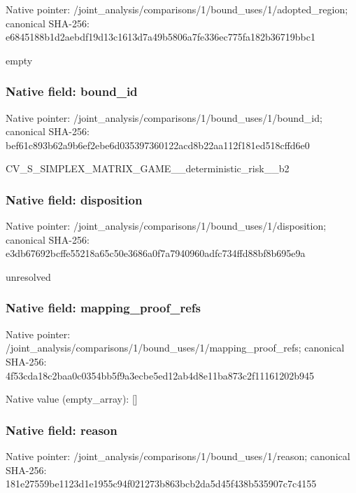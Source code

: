 \documentclass[10pt,a4paper]{article}
\begin{document}
Native pointer: /joint\_analysis/comparis\allowbreak{}ons/1/bound\_uses/1/adopt\allowbreak{}ed\_region; canonical SHA-256: e6845188b1d2aebdf19d13c1\allowbreak{}613d7a49b5806a7fe336ec77\allowbreak{}5fa182b36719bbc1


empty


\subsubsection{Native field: bound\_id}


Native pointer: /joint\_analysis/comparis\allowbreak{}ons/1/bound\_uses/1/bound\allowbreak{}\_id; canonical SHA-256: bef61c893b62a9b6ef2ebe6d\allowbreak{}035397360122acd8b22aa112\allowbreak{}f181ed518cffd6e0


CV\_S\_SIMPLEX\_MATRIX\_GAME\allowbreak{}\_\_deterministic\_risk\_\_b2


\subsubsection{Native field: disposition}


Native pointer: /joint\_analysis/comparis\allowbreak{}ons/1/bound\_uses/1/dispo\allowbreak{}sition; canonical SHA-256: e3db67692bcffe55218a65c5\allowbreak{}0e3686a0f7a7940960adfc73\allowbreak{}4ffd88bf8b695e9a


unresolved


\subsubsection{Native field: mapping\_proof\_refs}


Native pointer: /joint\_analysis/comparis\allowbreak{}ons/1/bound\_uses/1/mappi\allowbreak{}ng\_proof\_refs; canonical SHA-256: 4f53cda18c2baa0c0354bb5f\allowbreak{}9a3ecbe5ed12ab4d8e11ba87\allowbreak{}3c2f11161202b945



Native value (empty\_array): []



\subsubsection{Native field: reason}


Native pointer: /joint\_analysis/comparis\allowbreak{}ons/1/bound\_uses/1/reaso\allowbreak{}n; canonical SHA-256: 181e27559be1123d1e1955c9\allowbreak{}4f021273b863bcb2da5d45f4\allowbreak{}38b535907c7c4155
\end{document}

